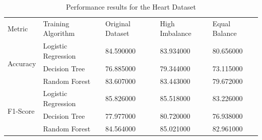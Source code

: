 \begin{table}[p]
\caption{Performance results for the Heart Dataset}
\begin{tabular}{lllll}
Metric & Training Algorithm & Original Dataset & High Imbalance & Equal Balance \\
\multirow[c]{3}{*}{Accuracy} & Logistic Regression & 84.590000 & 83.934000 & 80.656000 \\
 & Decision Tree & 76.885000 & 79.344000 & 73.115000 \\
 & Random Forest & 83.607000 & 83.443000 & 79.672000 \\
\multirow[c]{3}{*}{F1-Score} & Logistic Regression & 85.826000 & 85.518000 & 83.226000 \\
 & Decision Tree & 77.977000 & 80.720000 & 76.938000 \\
 & Random Forest & 84.564000 & 85.021000 & 82.961000 \\
\end{tabular}
\end{table}
